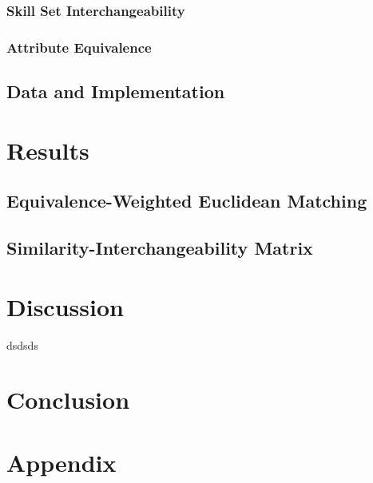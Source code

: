 \documentclass{article}
\begin{document}
\subsubsection{Skill Set Interchangeability}
\InterchangeabilityFunction
\InterchangeabilityMatrix
\SignalFunction

\subsubsection{Attribute Equivalence}
\AttributeEquivalence

\subsection{Data and Implementation}

\section{Results}
\subsection{Equivalence-Weighted Euclidean Matching}

\subsection{Similarity-Interchangeability Matrix}


\section{Discussion}
dsdsds \parencite[]{dsdsds}


\section{Conclusion} 


\newpage
\printbibliography[
    heading=bibintoc,
    title={References}
]


\newpage
\section*{Appendix}



\end{document}
